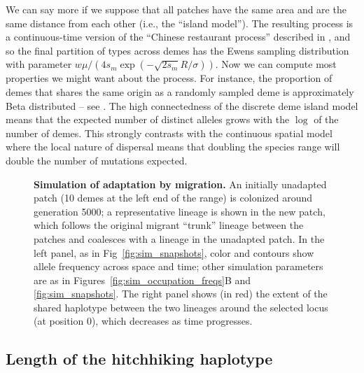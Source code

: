 \documentclass[10pt,letterpaper]{article}
\newcommand{\citet}[1]{\cite{#1}}
\begin{document}
We can say more if we suppose that all patches have the same area and are the same distance from each other
(i.e., the ``island model'').
The resulting process is a continuous-time version of the ``Chinese restaurant process''
described in \citet{aldous1985exchangeability}, %
and so the final partition of types across demes has the Ewens
sampling distribution with parameter $w \mu / (4 s_m \exp (-\sqrt{2 s_m}R/\sigma))$.
Now we can compute most properties we might want about the process.
For instance, the proportion of demes that shares the same origin as a randomly sampled deme
is approximately Beta distributed -- see \cite{donnelly1989continuity}.
The high connectedness of the discrete deme island model means that the expected number of distinct alleles
grows with the $\log$ of the number of demes.
This strongly contrasts with the continuous spatial model 
where the local nature of dispersal means that doubling the species range will double the number of mutations expected. 


\begin{figure}[ht]
  \begin{center}
  \end{center}
  \caption{
  \textbf{Simulation of adaptation by migration.}
  An initially unadapted patch (10 demes at the left end of the range) is colonized around generation 5000;
  a representative lineage is shown in the new patch, which follows the original migrant ``trunk'' lineage
  between the patches and coalesces with a lineage in the unadapted patch.
  In the left panel, as in Fig~\ref{fig:sim_snapshots}, color and contours show allele frequency across space and time;
  other simulation parameters are as in Figures~\ref{fig:sim_occupation_freqs}B and \ref{fig:sim_snapshots}.
  The right panel shows (in red) the extent of the shared haplotype between the two lineages around the selected locus (at position 0),
  which decreases as time progresses. 
  \label{fig:lineagesmotion}
  }
\end{figure}




\subsection*{Length of the hitchhiking haplotype}
\label{ss:haplotype_length}
\end{document}
